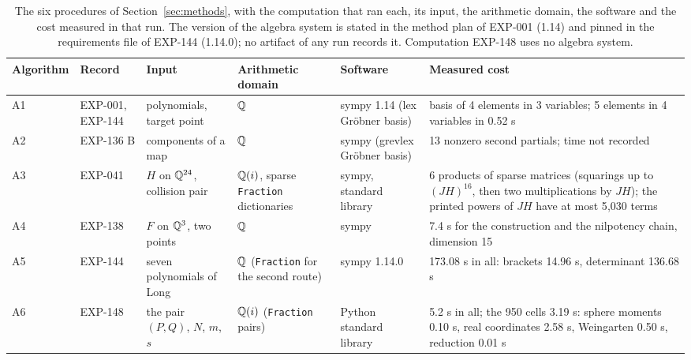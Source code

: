 \begin{table}[t]
\centering\footnotesize
\setlength{\tabcolsep}{3pt}
\begin{tabular}{@{}lL{0.11\textwidth}L{0.17\textwidth}L{0.15\textwidth}L{0.12\textwidth}L{0.24\textwidth}@{}}
\toprule
Algorithm & Record & Input & Arithmetic domain & Software & Measured cost \\
\midrule
A1 & EXP-001, EXP-144 & polynomials, target point & $\mathbb{Q}$ & sympy 1.14 (lex Gr\"obner basis) & basis of 4 elements in 3 variables; 5 elements in 4 variables in 0.52 s \\[2pt]
A2 & EXP-136 B & components of a map & $\mathbb{Q}$ & sympy (grevlex Gr\"obner basis) & 13 nonzero second partials; time not recorded \\[2pt]
A3 & EXP-041 & $H$ on $\mathbb{Q}^{24}$, collision pair & $\mathbb{Q}(i)$, sparse \texttt{Fraction} dictionaries & sympy, standard library & 6 products of sparse matrices (squarings up to $(JH)^{16}$, then two multiplications by $JH$); the printed powers of $JH$ have at most 5{,}030 terms \\[2pt]
A4 & EXP-138 & $F$ on $\mathbb{Q}^3$, two points & $\mathbb{Q}$ & sympy & 7.4 s for the construction and the nilpotency chain, dimension 15 \\[2pt]
A5 & EXP-144 & seven polynomials of Long & $\mathbb{Q}$ (\texttt{Fraction} for the second route) & sympy 1.14.0 & 173.08 s in all: brackets 14.96 s, determinant 136.68 s \\[2pt]
A6 & EXP-148 & the pair $(P,Q)$, $N$, $m$, $s$ & $\mathbb{Q}(i)$ (\texttt{Fraction} pairs) & Python standard library & 5.2 s in all; the 950 cells 3.19 s: sphere moments 0.10 s, real coordinates 2.58 s, Weingarten 0.50 s, reduction 0.01 s \\[2pt]
\bottomrule
\end{tabular}
\caption{The six procedures of Section~\ref{sec:methods}, with the computation that ran each, its input, the arithmetic domain, the software and the cost measured in that run. The version of the algebra system is stated in the method plan of EXP-001 (1.14) and pinned in the requirements file of EXP-144 (1.14.0); no artifact of any run records it. Computation EXP-148 uses no algebra system.}
\label{tab:cost}
\end{table}
